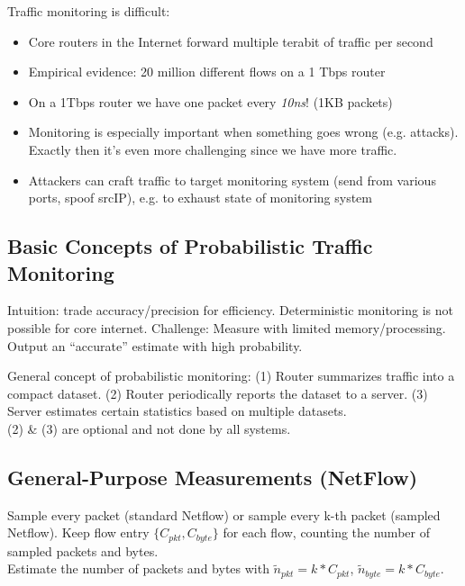 \documentclass[11pt,oneside,a4paper]{article}
\begin{document}
\noindent Traffic monitoring is difficult:

\vspace{-\topsep}
\begin{itemize}
	\setlength{\itemsep}{0pt}
	\setlength{\parskip}{0pt}
	\item Core routers in the Internet forward multiple	terabit of traffic per second
	\item Empirical evidence: 20 million different flows on	a 1 Tbps router
	\item On a 1Tbps router we have one packet every \textit{10ns}! (1KB packets)
	\item Monitoring is especially important when something goes wrong (e.g. attacks). Exactly then it's even more challenging since we have more traffic.
	\item Attackers can craft traffic to target monitoring system (send from various ports, spoof srcIP), e.g. to exhaust state of monitoring system
\end{itemize}
\vspace{-\topsep}

\subsection{Basic Concepts of Probabilistic Traffic	Monitoring}

Intuition: trade accuracy/precision for efficiency. Deterministic monitoring is not possible for core internet. Challenge: Measure with limited memory/processing. Output an “accurate” estimate with high probability.

General concept of probabilistic monitoring: (1) Router summarizes traffic into a compact dataset. (2) Router periodically reports the dataset to a server. (3) Server estimates certain statistics based on multiple datasets.\\
(2) \& (3) are optional and not done by all systems.

\subsection{General-Purpose Measurements (NetFlow)}

Sample every packet (standard Netflow) or sample every k-th packet (sampled Netflow). Keep flow entry $\{C_{pkt}, C_{byte}\}$ for each flow, counting the number of sampled packets and bytes.\\ Estimate the number of packets and bytes with $\widetilde{n}_{pkt} = k*C_{pkt}$, $\widetilde{n}_{byte} = k*C_{byte}$.
\end{document}
